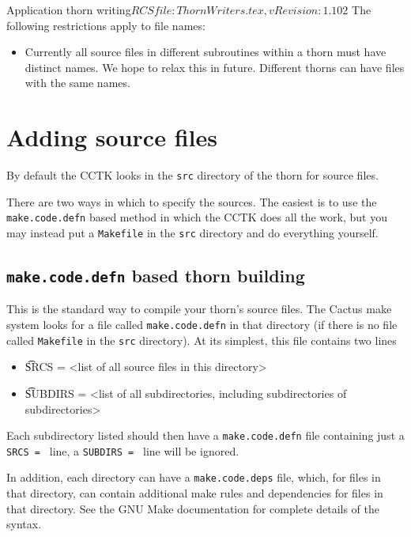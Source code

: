 \begin{cactuspart}{2}{Application thorn writing}{$RCSfile: ThornWriters.tex,v $}{$Revision: 1.102 $}
The following restrictions apply to file names:
\begin{itemize}
\item Currently all source files in different subroutines within a
thorn must have distinct names.  We hope
to relax this in future.  Different thorns can have files with the same names.
\end{itemize}

\section{Adding source files}

By default the CCTK looks in the {\tt src} directory of the thorn for source
files.

There are two ways in which to specify the sources.  The easiest is to use the
{\tt make.code.defn} based method in which the CCTK does all the work, but you
may instead put a {\tt Makefile} in the {\tt src} directory and do everything
yourself.

\subsection{{\tt make.code.defn} based thorn building}
\label{sec:mabathbu}

This is the standard way to compile your thorn's source files.
The Cactus make system looks for a file called {\tt make.code.defn} in that
directory (if there is no file called {\tt Makefile} in the {\tt src} directory).  At its simplest, this file contains two lines

\begin{itemize}
\item {\t SRCS = <list of all source files in this directory>}

\item {\t SUBDIRS = <list of all subdirectories, including subdirectories of subdirectories>}

\end{itemize}

Each subdirectory listed should then have a {\tt make.code.defn} file
containing just a {\tt SRCS = } line, a {\tt SUBDIRS = } line will
be ignored.

In addition, each directory can have a {\tt make.code.deps} file, which,
for files in that directory, can contain additional make rules and dependencies
for files in that directory.  See the GNU Make documentation for complete details of the
syntax.


\end{cactuspart}
